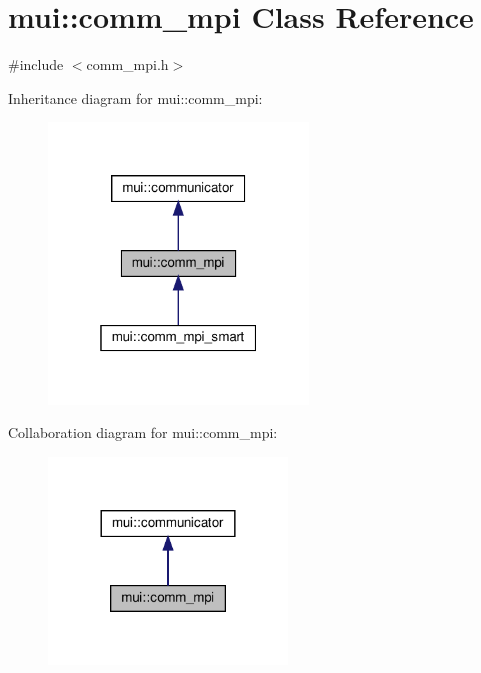 \hypertarget{classmui_1_1comm__mpi}{}\section{mui\+:\+:comm\+\_\+mpi Class Reference}
\label{classmui_1_1comm__mpi}


{\ttfamily \#include $<$comm\+\_\+mpi.\+h$>$}



Inheritance diagram for mui\+:\+:comm\+\_\+mpi\+:
\nopagebreak
\begin{figure}[H]
\begin{center}
\leavevmode
\includegraphics[width=196pt]{classmui_1_1comm__mpi__inherit__graph}
\end{center}
\end{figure}


Collaboration diagram for mui\+:\+:comm\+\_\+mpi\+:
\nopagebreak
\begin{figure}[H]
\begin{center}
\leavevmode
\includegraphics[width=180pt]{classmui_1_1comm__mpi__coll__graph}
\end{center}
\end{figure}
